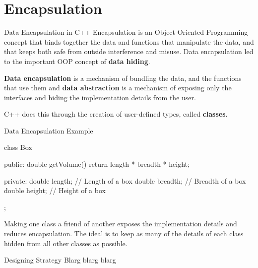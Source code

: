 \documentclass[../lecture5-objectorientation.tex]{subfiles}
\begin{document}
\section{Encapsulation}


\begin{frame}[fragile]{Data Encapsulation in C++}
    Encapsulation is an Object Oriented Programming concept that binds together the data and functions that manipulate the data, and that keeps both safe from outside interference and misuse. Data encapsulation led to the important OOP concept of \textbf{data hiding}.

    \textbf{Data encapsulation} is a mechanism of bundling the data, and the functions that use them and \textbf{data abstraction} is a mechanism of exposing only the interfaces and hiding the implementation details from the user.

    \note
    {
        C++ does this through the creation of user-defined types, called \textbf{classes}.
    }
\end{frame}


\begin{frame}[fragile]{Data Encapsulation Example}
    \begin{cppcode}[lastline=13]
class Box
{
    public:
        double getVolume()
        {
            return length * breadth * height;
        }

    private:
        double length;  // Length of a box
        double breadth; // Breadth of a box
        double height;  // Height of a box
};
    \end{cppcode}

    Making one class a friend of another exposes the implementation details and reduces encapsulation. The ideal is to keep as many of the details of each class hidden from all other classes as possible.
\end{frame}


\begin{frame}[fragile]{Designing Strategy}
    Blarg blarg blarg
\end{frame}

\end{document}
